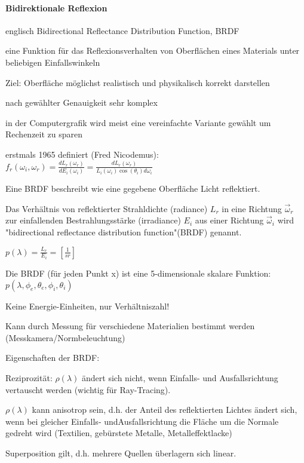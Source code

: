 \documentclass[landscape]{article}
\begin{document}
\begin{multicols}{3}
  \paragraph{Bidirektionale Reflexion}
  \begin{itemize*}
    \item englisch Bidirectional Reflectance Distribution Function, BRDF
    \item eine Funktion für das Reflexionsverhalten von Oberflächen eines Materials unter beliebigen Einfallswinkeln
    \item Ziel: Oberfläche möglichst realistisch und physikalisch korrekt darstellen
    \item nach gewählter Genauigkeit sehr komplex
    \item in der Computergrafik wird meist eine vereinfachte Variante gewählt um Rechenzeit zu sparen
    \item erstmals 1965 definiert (Fred Nicodemus): $f_r(\omega_i, \omega_r)=\frac{dL_r(\omega_r)}{dE_i(\omega_i)}=\frac{dL_r(\omega_r)}{L_i(\omega_i)\cos(\theta_i)d\omega_i}$
    \item Eine BRDF beschreibt wie eine gegebene Oberfläche Licht reflektiert.
    \item Das Verhältnis von reflektierter Strahldichte (radiance) $L_r$ in eine Richtung $\vec{\omega}_r$ zur einfallenden Bestrahlungsstärke (irradiance) $E_i$ aus einer Richtung $\vec{\omega}_i$ wird "bidirectional reflectance distribution function"(BRDF) genannt.
    \item $p(\lambda)=\frac{L_r}{E_i}=[\frac{1}{sr}]$
    \item Die BRDF (für jeden Punkt x) ist eine 5-dimensionale skalare Funktion: $p(\lambda, \phi_e, \theta_e, \phi_i, \theta_i)$
    \item Keine Energie-Einheiten, nur Verhältniszahl!
    \item Kann durch Messung für verschiedene Materialien bestimmt werden (Messkamera/Normbeleuchtung)
    \item Eigenschaften der BRDF:
    \item Reziprozität: $\rho(\lambda)$ ändert sich nicht, wenn Einfalls- und Ausfallsrichtung vertauscht werden (wichtig für Ray-Tracing).
    \item $\rho(\lambda)$ kann anisotrop sein, d.h. der Anteil des reflektierten Lichtes ändert sich, wenn bei gleicher Einfalls- undAusfallsrichtung die Fläche um die Normale gedreht wird (Textilien, gebürstete Metalle, Metalleffektlacke)
    \item Superposition gilt, d.h. mehrere Quellen überlagern sich linear.
  \end{itemize*}
  

\end{multicols}
\end{document}
